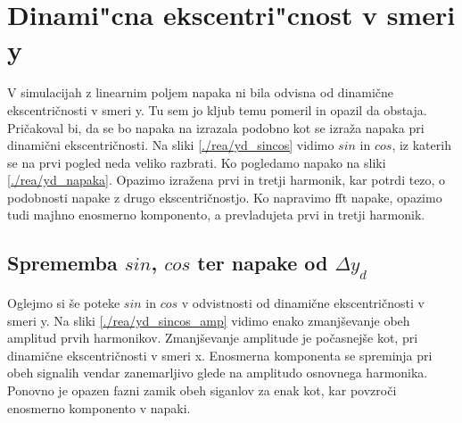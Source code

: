 \section{Dinami"cna ekscentri"cnost v smeri y}

V simulacijah z linearnim poljem napaka ni bila odvisna od dinamične ekscentričnosti v smeri y. Tu sem jo kljub temu pomeril in opazil da obstaja. Pričakoval bi, da se bo napaka na izrazala podobno kot se izraža napaka pri dinamični ekscentričnosti. Na sliki \ref{./rea/yd_sincos} vidimo $sin$ in $cos$, iz katerih se na prvi pogled neda veliko razbrati. Ko pogledamo napako na sliki \ref{./rea/yd_napaka}. Opazimo izražena prvi in tretji harmonik, kar potrdi tezo, o podobnosti napake z drugo ekscentričnostjo. Ko napravimo fft napake, opazimo tudi majhno enosmerno komponento, a prevladujeta prvi in tretji harmonik.


\newpage
\subsection{Sprememba $sin$, $cos$ ter napake od $\Delta y_d$}

Oglejmo si še poteke $sin$ in $cos$ v odvistnosti od dinamične ekscentričnosti v smeri y. Na sliki \ref{./rea/yd_sincos_amp} vidimo enako zmanjševanje obeh amplitud prvih harmonikov. Zmanjševanje amplitude je počasnejše kot, pri dinamične ekscentričnosti v smeri x. Enosmerna komponenta se spreminja pri obeh signalih vendar zanemarljivo glede na amplitudo osnovnega harmonika. Ponovno je opazen fazni zamik obeh siganlov za enak kot, kar povzroči enosmerno komponento v napaki.


